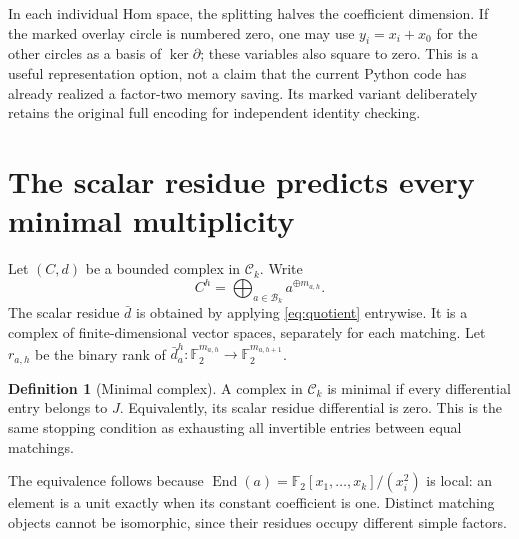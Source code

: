 \documentclass[11pt,letterpaper]{article}
\theoremstyle{definition}
\newtheorem{definition}[theorem]{Definition}
\theoremstyle{remark}
\newcommand{\F}{\mathbb F_2}
\newcommand{\C}{\mathcal C}
\newcommand{\B}{\mathcal B}
\newcommand{\End}{\operatorname{End}}
\begin{document}
In each individual Hom space, the splitting halves the coefficient dimension.
If the marked overlay circle is numbered zero, one may use
$y_i=x_i+x_0$ for the other circles as a basis of $\ker\partial$; these
variables also square to zero. This is a useful representation option, not a
claim that the current Python code has already realized a factor-two memory
saving. Its marked variant deliberately retains the original full encoding
for independent identity checking.

\section{The scalar residue predicts every minimal multiplicity}
\label{sec:survivors}
Let $(C,d)$ be a bounded complex in $\C_k$. Write
\[
 C^h=\bigoplus_{a\in\B_k}a^{\oplus m_{a,h}}.
\]
The scalar residue $\bar d$ is obtained by applying \cref{eq:quotient}
entrywise. It is a complex of finite-dimensional vector spaces, separately for
each matching. Let $r_{a,h}$ be the binary rank of
$\bar d^h_a:\F^{m_{a,h}}\to\F^{m_{a,h+1}}$.

\begin{definition}[Minimal complex]
A complex in $\C_k$ is minimal if every differential entry belongs to $J$.
Equivalently, its scalar residue differential is zero. This is the same stopping
condition as exhausting all invertible entries between equal matchings.
\end{definition}
The equivalence follows because
$\End(a)=\F[x_1,\ldots,x_k]/(x_i^2)$ is local: an element is a unit exactly
when its constant coefficient is one. Distinct matching objects cannot be
isomorphic, since their residues occupy different simple factors.
\end{document}
